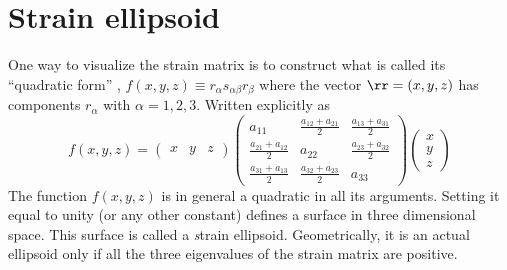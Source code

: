 \section{Strain ellipsoid}
\label{sec:strain_ellipsoid}
One way to visualize the strain matrix is to construct what is called
its ``quadratic form'' , $f(x,y,z) \equiv
r_{\alpha}s_{\alpha\beta}r_{\beta} $
where the vector $\rr = (x,y,z)$ has components $r_{\alpha}$ with
$\alpha=1,2,3$. Written explicitly as
\begin{equation}
f(x,y,z) = 
\begin{pmatrix}
x & y & z 
\end{pmatrix}
\begin{pmatrix}
a_{11} & \frac{a_{12}+a_{21}}{2} &
    \frac{a_{13}+a_{31}}{2}  \\
\frac{a_{21}+a_{12}}{2} &  a_{22} &
    \frac{a_{23}+a_{32}}{2}  \\
\frac{a_{31}+a_{13}}{2} &
    \frac{a_{32}+a_{23}}{2} & a_{33} 
\end{pmatrix}
\begin{pmatrix}
x \\ y \\ z 
\end{pmatrix} 
\label{eq:ellipsoid}
\end{equation}
The function $f(x,y,z)$ is in general a quadratic in all its
arguments. Setting it equal to unity (or any other constant) defines a
surface in three dimensional space. This surface is called a {\textit strain
ellipsoid}. Geometrically, it is an actual ellipsoid only if all the
three eigenvalues of the strain matrix are positive.
% 

